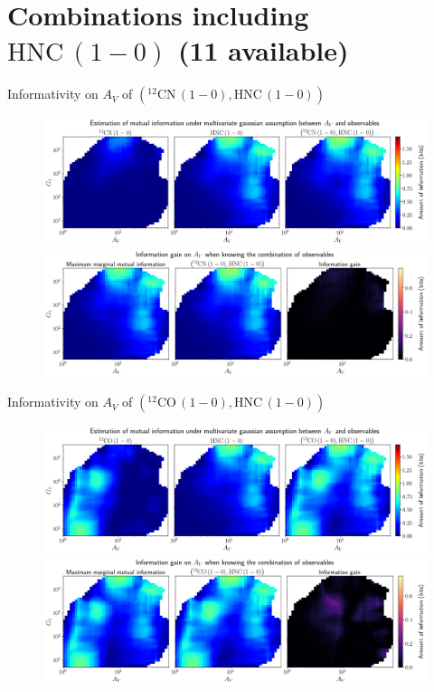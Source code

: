 \documentclass{beamer}
\begin{document}
\section{Combinations including $\mathrm{HNC\,(1-0)}$ (11 available)}

\begin{frame}{Informativity on $A_V$ of $\left(\mathrm{^{12}CN\,(1-0)},\mathrm{HNC\,(1-0)}\right)$}
    \begin{figure}
        \centering
        \includegraphics[width=0.95\linewidth]{../linearinfogauss/av__12cn10_hnc10_linearinfogauss.png}
        \vfill
        \includegraphics[width=0.95\linewidth]{../linearinfogauss/av__12cn10_hnc10_linearinfogauss_gain.png}
    \end{figure}
\end{frame}

\begin{frame}{Informativity on $A_V$ of $\left(\mathrm{^{12}CO\,(1-0)},\mathrm{HNC\,(1-0)}\right)$}
    \begin{figure}
        \centering
        \includegraphics[width=0.95\linewidth]{../linearinfogauss/av__12co10_hnc10_linearinfogauss.png}
        \vfill
        \includegraphics[width=0.95\linewidth]{../linearinfogauss/av__12co10_hnc10_linearinfogauss_gain.png}
    \end{figure}
\end{frame}
\end{document}
